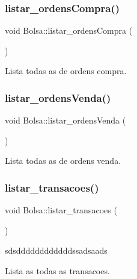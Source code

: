 \subsubsection{\texorpdfstring{listar\+\_\+ordens\+Compra()}{listar\_ordensCompra()}}
{\footnotesize\ttfamily void Bolsa\+::listar\+\_\+ordens\+Compra (\begin{DoxyParamCaption}{ }\end{DoxyParamCaption})}



Lista todas as de ordens compra. 

\hypertarget{class_bolsa_abd28d5b93c338a05deccf0adbac23ba1}{}\label{class_bolsa_abd28d5b93c338a05deccf0adbac23ba1} 
\subsubsection{\texorpdfstring{listar\+\_\+ordens\+Venda()}{listar\_ordensVenda()}}
{\footnotesize\ttfamily void Bolsa\+::listar\+\_\+ordens\+Venda (\begin{DoxyParamCaption}{ }\end{DoxyParamCaption})}



Lista todas as de ordens venda. 

\hypertarget{class_bolsa_a4676ec9295a14426f3c70e91dd36fde1}{}\label{class_bolsa_a4676ec9295a14426f3c70e91dd36fde1} 
\subsubsection{\texorpdfstring{listar\+\_\+transacoes()}{listar\_transacoes()}}
{\footnotesize\ttfamily void Bolsa\+::listar\+\_\+transacoes (\begin{DoxyParamCaption}{ }\end{DoxyParamCaption})}



sdsddddddddddddssadsaads 

Lista as todas as transacoes. \hypertarget{class_bolsa_ad96a358bf03c103f55b8139da8a0d61a}{}\label{class_bolsa_ad96a358bf03c103f55b8139da8a0d61a} 
